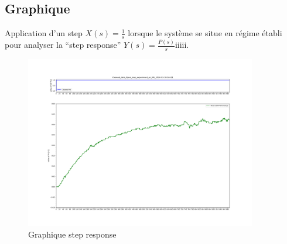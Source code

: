 \documentclass{article}
\begin{document}
\subsection{Graphique}
Application d'un step $X(s) = \frac{1}{s}$ lorsque le système se situe en régime établi pour analyser la ``step response'' $Y(s) = \frac{P(s)}{s}$iiiii.
\begin{figure}[h]
    \centering
    \includegraphics[width=0.9\textwidth]{../Plots/Graphical_methods_Cleaned_data_Open_loop_experiment_on_MV_2024-03-18-16h11.png}
    \caption{Graphique step response}
    \label{fig:Graph1}
\end{figure}
\end{document}
